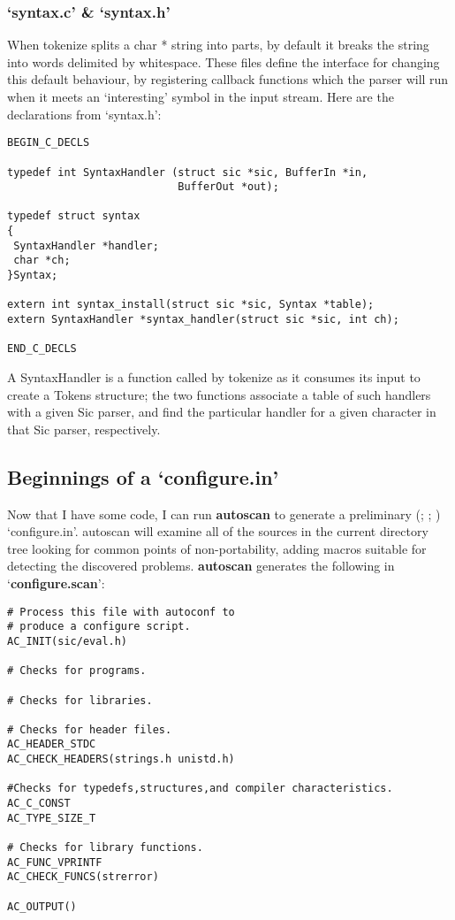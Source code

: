 \subsubsection{`syntax.c' \& `syntax.h'}


When tokenize splits a char * string into parts, by default it breaks the 
string into words delimited by whitespace. These files define the interface 
for changing this default behaviour, by registering callback functions which 
the parser will run when it meets an `interesting' symbol in the input stream.
Here are the declarations from `syntax.h': 

\begin{Verbatim}[frame=single]
BEGIN_C_DECLS

typedef int SyntaxHandler (struct sic *sic, BufferIn *in,
                           BufferOut *out);

typedef struct syntax 
{
 SyntaxHandler *handler;
 char *ch;
}Syntax;

extern int syntax_install(struct sic *sic, Syntax *table);
extern SyntaxHandler *syntax_handler(struct sic *sic, int ch);

END_C_DECLS
\end{Verbatim}

A SyntaxHandler is a function called by tokenize as it consumes its input to 
create a Tokens structure; the two functions associate a table of such handlers
with a given Sic parser, and find the particular handler for a given character 
in that Sic parser, respectively. 

\subsection{Beginnings of a `configure.in'}\label{boac}
Now that I have some code, I can run \textbf{autoscan} to generate a 
preliminary ({\MaQ{}}; {\McQ{}}; {\McQ{}}) `configure.in'. autoscan will examine all of 
the sources in the current directory tree looking for common points of 
non-portability, adding macros suitable for detecting the discovered problems.
\textbf{autoscan} generates the following in `\textbf{configure.scan}': 

\begin{Verbatim}[frame=single]
# Process this file with autoconf to 
# produce a configure script.
AC_INIT(sic/eval.h)

# Checks for programs.

# Checks for libraries.

# Checks for header files.
AC_HEADER_STDC
AC_CHECK_HEADERS(strings.h unistd.h)

#Checks for typedefs,structures,and compiler characteristics.
AC_C_CONST
AC_TYPE_SIZE_T

# Checks for library functions.
AC_FUNC_VPRINTF
AC_CHECK_FUNCS(strerror)

AC_OUTPUT()
\end{Verbatim}

